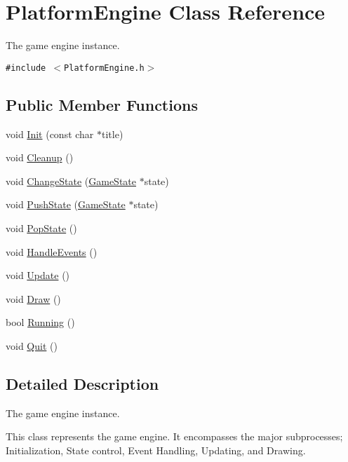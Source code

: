 \hypertarget{class_platform_engine}{
\section{PlatformEngine Class Reference}
\label{class_platform_engine}
}
The game engine instance.  


{\tt \#include $<$PlatformEngine.h$>$}

\subsection*{Public Member Functions}
\begin{CompactItemize}
\item 
void \hyperlink{class_platform_engine_31d40c1f435565850964c6e9f212baa5}{Init} (const char $\ast$title)
\item 
void \hyperlink{class_platform_engine_361b54312d9ec2fa842cd982f67100f9}{Cleanup} ()
\item 
void \hyperlink{class_platform_engine_d2b335545c9ab6bce7be7c014bc8c528}{ChangeState} (\hyperlink{class_game_state}{GameState} $\ast$state)
\item 
void \hyperlink{class_platform_engine_98e3d34b6ee831bcc1d26bac83bfe8d8}{PushState} (\hyperlink{class_game_state}{GameState} $\ast$state)
\item 
void \hyperlink{class_platform_engine_cf001abec596906465197d1220db2230}{PopState} ()
\item 
void \hyperlink{class_platform_engine_7fc47bff353292f1a1435d78664df36d}{HandleEvents} ()
\item 
void \hyperlink{class_platform_engine_d3ab75304226ad3fcac6b66ce3cedbc7}{Update} ()
\item 
void \hyperlink{class_platform_engine_cd756d58f81c5e28efe98ae075367a5c}{Draw} ()
\item 
bool \hyperlink{class_platform_engine_31ec37c0222f4694cc3c0e819e143038}{Running} ()
\item 
void \hyperlink{class_platform_engine_dbcdd91813cabbe51bb2f86eb23e772a}{Quit} ()
\end{CompactItemize}


\subsection{Detailed Description}
The game engine instance. 

This class represents the game engine. It encompasses the major subprocesses; Initialization, State control, Event Handling, Updating, and Drawing. 

